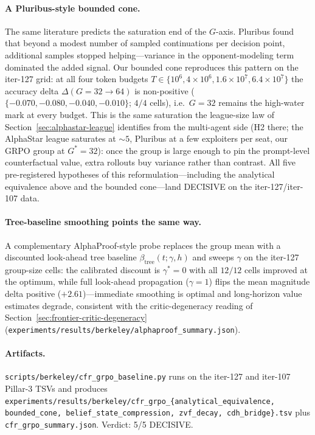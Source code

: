 \paragraph{A Pluribus-style bounded cone.}
The same literature predicts the saturation end of the $G$-axis.
Pluribus \citep{brown2019pluribus} found that beyond a modest number
of sampled continuations per decision point, additional samples
stopped helping---variance in the opponent-modeling term dominated
the added signal. Our bounded cone reproduces this pattern on the
iter-127 grid: at all four token budgets
$T \in \{10^6, 4{\times}10^6, 1.6{\times}10^7, 6.4{\times}10^7\}$ the
accuracy delta $\Delta(G{=}32{\to}64)$ is non-positive
($\{-0.070, -0.080, -0.040, -0.010\}$; $4/4$ cells), i.e.\
$G{=}32$ remains the high-water mark at every budget. This is the
same saturation the league-size law of
Section~\ref{sec:alphastar-league} identifies from the multi-agent
side (H2 there; the AlphaStar league saturates at $\sim 5$, Pluribus
at a few exploiters per seat, our GRPO group at $G^\ast{=}32$): once
the group is large enough to pin the prompt-level counterfactual
value, extra rollouts buy variance rather than contrast. All five
pre-registered hypotheses of this reformulation---including the
analytical equivalence above and the bounded cone---land DECISIVE
on the iter-127/iter-107 data.

\paragraph{Tree-baseline smoothing points the same way.}
A complementary AlphaProof-style probe \citep{alphaproof2025nature}
replaces the group mean with a discounted look-ahead tree baseline
$\beta_{\text{tree}}(t;\gamma,h)$ and sweeps $\gamma$ on the iter-127
group-size cells: the calibrated discount is $\gamma^\ast{=}0$ with
all $12/12$ cells improved at the optimum, while full look-ahead
propagation ($\gamma{=}1$) flips the mean magnitude delta positive
($+2.61$)---immediate smoothing is optimal and long-horizon value
estimates degrade, consistent with the critic-degeneracy reading of
Section~\ref{sec:frontier-critic-degeneracy}
(\texttt{experiments/results/berkeley/alphaproof\_summary.json}).

\paragraph{Artifacts.}
\texttt{scripts/berkeley/cfr\_grpo\_baseline.py} runs on the iter-127
and iter-107 Pillar-3 TSVs and produces
\texttt{experiments/results/berkeley/cfr\_grpo\_\{analytical\_equivalence,
bounded\_cone, belief\_state\_compression, zvf\_decay, cdh\_bridge\}.tsv}
plus \texttt{cfr\_grpo\_summary.json}. Verdict: 5/5 DECISIVE.
